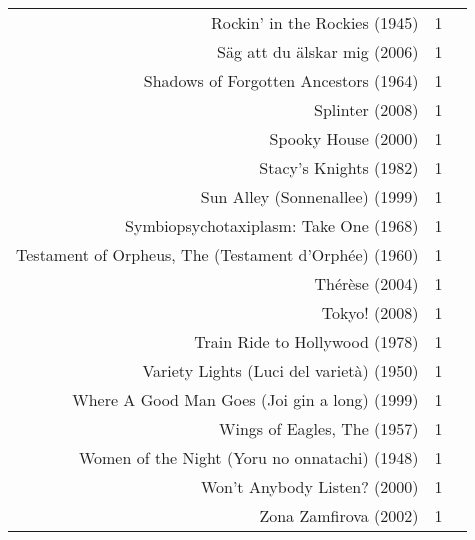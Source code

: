 \documentclass[11pt]{article}
\begin{document}
\begin{tabular}{r|ll}
	 Rockin' in the Rockies (1945)                         & 1                                                    \\
	 Säg att du älskar mig (2006)                          & 1                                                    \\
	 Shadows of Forgotten Ancestors (1964)                 & 1                                                    \\
	 Splinter (2008)                                       & 1                                                    \\
	 Spooky House (2000)                                   & 1                                                    \\
	 Stacy's Knights (1982)                                & 1                                                    \\
	 Sun Alley (Sonnenallee) (1999)                        & 1                                                    \\
	 Symbiopsychotaxiplasm: Take One (1968)                & 1                                                    \\
	 Testament of Orpheus, The (Testament d'Orphée) (1960) & 1                                                    \\
	 Thérèse (2004)                                        & 1                                                    \\
	 Tokyo! (2008)                                         & 1                                                    \\
	 Train Ride to Hollywood (1978)                        & 1                                                    \\
	 Variety Lights (Luci del varietà) (1950)              & 1                                                    \\
	 Where A Good Man Goes (Joi gin a long) (1999)         & 1                                                    \\
	 Wings of Eagles, The (1957)                           & 1                                                    \\
	 Women of the Night (Yoru no onnatachi) (1948)         & 1                                                    \\
	 Won't Anybody Listen? (2000)                          & 1                                                    \\
	 Zona Zamfirova (2002)                                 & 1                                                    \\
\end{tabular}
\end{document}
